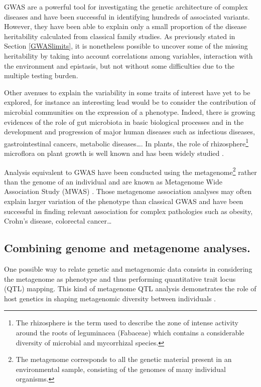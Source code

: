 \documentclass[]{book}
\let\rmarkdownfootnote\footnote%
\def\footnote{\protect\rmarkdownfootnote}
\begin{document}
GWAS are a powerful tool for investigating the genetic architecture of
complex diseases and have been successful in identifying hundreds of
associated variants. However, they have been able to explain only a
small proportion of the disease heritability calculated from classical
family studies. As previously stated in Section \ref{GWASlimits},
it is nonetheless possible to uncover some of the missing heritability
by taking into account correlations among variables, interaction with
the environment and epistasis, but not without some difficulties due to
the multiple testing burden.

Other avenues to explain the variability in some traits of interest have
yet to be explored, for instance an interesting lead would be to
consider the contribution of microbial communities on the expression of
a phenotype. Indeed, there is growing evidences of the role of gut
microbiota in basic biological processes and in the development and
progression of major human diseases such as infectious diseases,
gastrointestinal cancers, metabolic diseases\ldots{}\citep{wang_2107_human}. In
plants, the role of rhizosphere\footnote{The rhizosphere is the term used to describe the zone of intense
  activity around the roots of leguminacea (Fabaceae) which contains a
  considerable diversity of microbial and mycorrhizal species.} microflora on plant growth is well
known and has been widely studied
\citep{mukerji2002techniques, pinton2007rhizosphere}.

Analysis equivalent to GWAS have been conducted using the metagenome\footnote{The metagenome corresponds to all the genetic material present in
  an environmental sample, consisting of the genomes of many
  individual organisms.}
rather than the genome of an individual and are known as Metagenome Wide
Association Study (MWAS) \citep{wang2016metagenome, segata2011metagenomic}.
Those metagenome association analyses may often explain larger variation
of the phenotype than classical GWAS and have been successful in finding
relevant association for complex pathologies such as obesity, Crohn's
disease, colorectal cancer\ldots{}

\hypertarget{combining-genome-and-metagenome-analyses.}{%
\subsection{Combining genome and metagenome analyses.}\label{combining-genome-and-metagenome-analyses.}}

One possible way to relate genetic and metagenomic data consists in
considering the metagenome as phenotype and thus performing quantitative
trait locus (QTL) mapping. This kind of metagenome QTL analysis
demonstrates the role of host genetics in shaping metagenomic diversity
between individuals \citep{wang2016genome, srinivas2013genome}.
\end{document}
